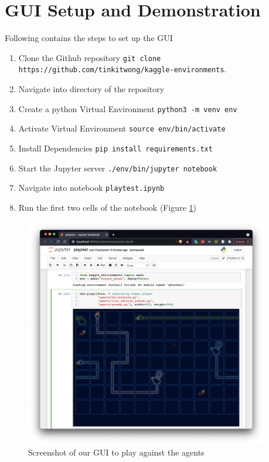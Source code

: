 \pagebreak
\section{GUI Setup and Demonstration}
\label{section_gui}

Following contains the steps to set up the GUI
\begin{enumerate}
  \item Clone the Github repository \newline \verb|git clone https://github.com/tinkitwong/kaggle-environments|.
  \item Navigate into directory of the repository
  \item Create a python Virtual Environment \verb|python3 -m venv env|
  \item Activate Virtual Environment \verb|source env/bin/activate|
  \item Install Dependencies \verb|pip install requirements.txt|
  \item Start the Jupyter server \verb|./env/bin/jupyter notebook|
  \item Navigate into notebook \verb|playtest.ipynb|
  \item Run the first two cells of the notebook (Figure \ref{figure_controls})
\end{enumerate}

\begin{figure}[!h]
\centering
\includegraphics[width=0.95\textwidth]{images/notebook.png}
\caption{Screenshot of our GUI to play against the agents}
\label{figure_controls}
\end{figure}



